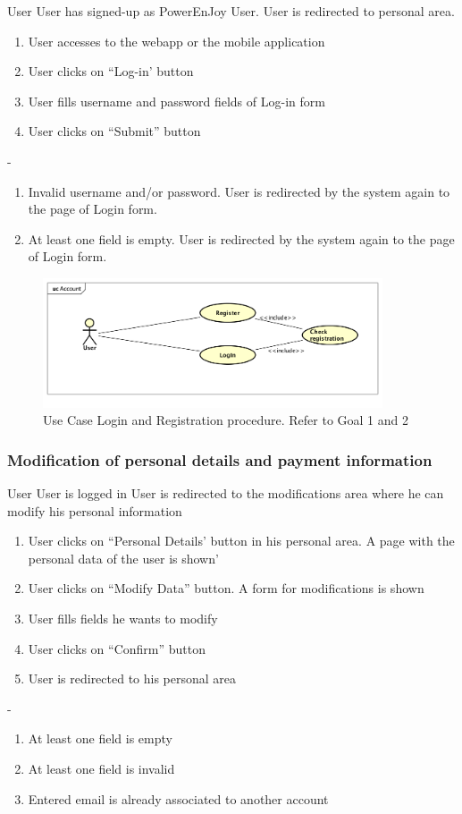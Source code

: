 {User}
{}
{User has signed-up as PowerEnJoy User.}
{User is redirected to personal area.}
{
	\begin{enumerate}
		\item User accesses to the webapp or the mobile application
		\item User clicks on ``Log-in' button
		\item User fills username and password fields of Log-in form
		\item User clicks on ``Submit'' button
	\end{enumerate}
}
{-}
{
	\begin{enumerate}
		\item Invalid username and/or password. User is redirected by the system again to the page of Login form.
		\item At least one field is empty. User is redirected by the system again to the page of Login form.
	\end{enumerate}
}

\begin{figure}[h]
	\centering
	\includegraphics[width=380px]{img/usecase_login_registration}
	\caption{Use Case Login and Registration procedure. Refer to Goal 1 and 2}
\end{figure}
\pagebreak


\subsubsection{Modification of personal details and payment information}
{User}
{}
{User is logged in}
{User is redirected to the modifications area where he can modify his personal information}
{
\begin{enumerate}
	\item User clicks on ``Personal Details' button in his personal area. A page with the personal data of the user is shown'
	\item User clicks on ``Modify Data'' button. A form for modifications is shown
	\item User fills fields he wants to modify
	\item User clicks on ``Confirm'' button
	\item User is redirected to his personal area
\end{enumerate}
}
{-}
{
	\begin{enumerate}
		\item At least one field is empty
		\item At least one field is invalid
		\item Entered email is already associated to another account
	\end{enumerate}
	}
\pagebreak


